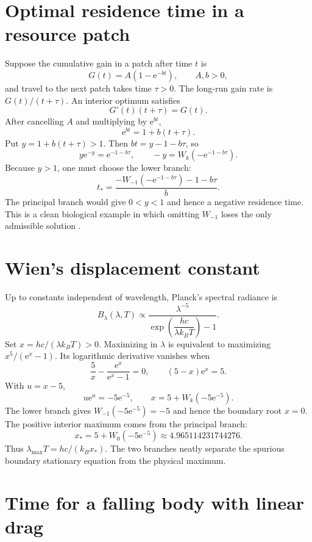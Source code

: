 \documentclass[11pt,oneside]{book}
\theoremstyle{definition}
\theoremstyle{remark}
\newcommand{\ee}{\mathrm e}
\begin{document}
\section{Optimal residence time in a resource patch}

Suppose the cumulative gain in a patch after time $t$ is
\[
 G(t)=A(1-\ee^{-bt}),
 \qquad A,b>0,
\]
and travel to the next patch takes time $\tau>0$.  The long-run gain rate is
$G(t)/(t+\tau)$.  An interior optimum satisfies
\[
 G'(t)(t+\tau)=G(t).
\]
After cancelling $A$ and multiplying by $\ee^{bt}$,
\begin{equation}\label{eq:patchcondition}
 \ee^{bt}=1+b(t+\tau).
\end{equation}
Put $y=1+b(t+\tau)>1$.  Then $bt=y-1-b\tau$, so
\[
 y\ee^{-y}=\ee^{-1-b\tau},
 \qquad
 -y=W_k(-\ee^{-1-b\tau}).
\]
Because $y>1$, one must choose the lower branch:
\begin{equation}\label{eq:patchtime}
 \boxed{
 t_*=\frac{-W_{-1}(-\ee^{-1-b\tau})-1-b\tau}{b}.}
\end{equation}
The principal branch would give $0<y<1$ and hence a negative residence time.
This is a clean biological example in which omitting $W_{-1}$ loses the only
admissible solution \cite{lehtonen2016}.

\section{Wien's displacement constant}

Up to constants independent of wavelength, Planck's spectral radiance is
\[
 B_\lambda(\lambda,T)
 \propto\frac{\lambda^{-5}}
 {\exp\!\left(\dfrac{hc}{\lambda k_BT}\right)-1}.
\]
Set $x=hc/(\lambda k_BT)>0$.  Maximizing in $\lambda$ is equivalent to
maximizing $x^5/(\ee^x-1)$.  Its logarithmic derivative vanishes when
\[
 \frac5x-\frac{\ee^x}{\ee^x-1}=0,
 \qquad
 (5-x)\ee^x=5.
\]
With $u=x-5$,
\[
 u\ee^u=-5\ee^{-5},
 \qquad
 x=5+W_k(-5\ee^{-5}).
\]
The lower branch gives $W_{-1}(-5\ee^{-5})=-5$ and hence the boundary root
$x=0$.  The positive interior maximum comes from the principal branch:
\begin{equation}\label{eq:wienconstant}
 \boxed{x_*=5+W_0(-5\ee^{-5})
 \approx4.965114231744276.}
\end{equation}
Thus $\lambda_{\max}T=hc/(k_Bx_*)$.  The two branches neatly separate the
spurious boundary stationary equation from the physical maximum.

\section{Time for a falling body with linear drag}
\end{document}
